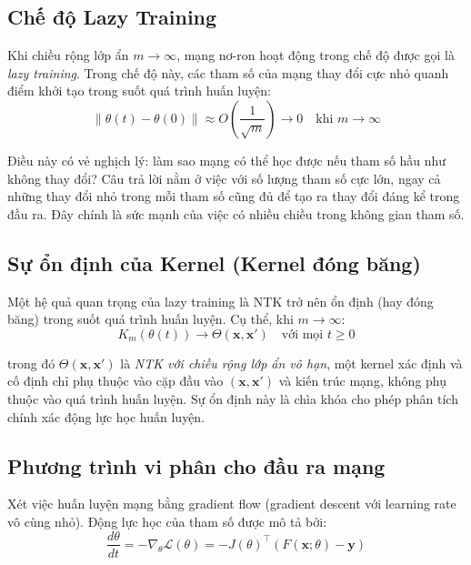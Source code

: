 \subsection{Chế độ Lazy Training}

Khi chiều rộng lớp ẩn $m \rightarrow \infty$, mạng nơ-ron hoạt động trong chế độ được gọi là \textit{lazy training}. Trong chế độ này, các tham số của mạng thay đổi cực nhỏ quanh điểm khởi tạo trong suốt quá trình huấn luyện:
\begin{equation}
    \|\theta(t) - \theta(0)\| \approx O\left(\frac{1}{\sqrt{m}}\right) \rightarrow 0 \quad \text{khi } m \rightarrow \infty
\end{equation}

Điều này có vẻ nghịch lý: làm sao mạng có thể học được nếu tham số hầu như không thay đổi? Câu trả lời nằm ở việc với số lượng tham số cực lớn, ngay cả những thay đổi nhỏ trong mỗi tham số cũng đủ để tạo ra thay đổi đáng kể trong đầu ra. Đây chính là sức mạnh của việc có nhiều chiều trong không gian tham số.

\subsection{Sự ổn định của Kernel (Kernel đóng băng)}

Một hệ quả quan trọng của lazy training là NTK trở nên ổn định (hay đóng băng) trong suốt quá trình huấn luyện. Cụ thể, khi $m \rightarrow \infty$:
\begin{equation}
    K_m(\theta(t)) \rightarrow \Theta(\mathbf{x}, \mathbf{x}') \quad \text{với mọi } t \geq 0
\end{equation}

trong đó $\Theta(\mathbf{x}, \mathbf{x}')$ là \textit{NTK với chiều rộng lớp ẩn vô hạn}, một kernel xác định và cố định chỉ phụ thuộc vào cặp đầu vào $(\mathbf{x}, \mathbf{x}')$ và kiến trúc mạng, không phụ thuộc vào quá trình huấn luyện. Sự ổn định này là chìa khóa cho phép phân tích chính xác động lực học huấn luyện.

\subsection{Phương trình vi phân cho đầu ra mạng}

Xét việc huấn luyện mạng bằng gradient flow (gradient descent với learning rate vô cùng nhỏ). Động lực học của tham số được mô tả bởi:
\begin{equation}
    \frac{d\theta}{dt} = -\nabla_\theta \mathcal{L}(\theta) = -J(\theta)^\top (F(\mathbf{x}; \theta) - \mathbf{y})
\end{equation}


